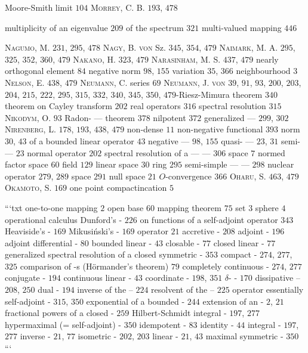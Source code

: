 Moore-Smith limit $104$ \textsc{Morrey}, C. B. $193$, $478$

multiplicity of an eigenvalue $209$ of the spectrum $321$ multi-valued mapping $446$ 

\textsc{Nagumo}, M. $231$, $295$, $478$ \textsc{Nagy}, B. \textsc{von} Sz. $345$, $354$, $479$ \textsc{Naimark}, M. A. $295$, $325$, $352$, $360$, $479$ \textsc{Nakano}, H. $323$, $479$ \textsc{Narasinham}, M. S. $437$, $479$ nearly orthogonal element $84$ negative norm $98$, $155$ variation $35$, $366$ neighbourhood $3$ \textsc{Nelson}, E. $438$, $479$ \textsc{Neumann}, C. series $69$ \textsc{Neumann}, J. \textsc{von} $39$, $91$, $93$, $200$, $203$, $204$, $215$, $222$, $295$, $315$, $332$, $340$, $345$, $350$, $479$-Riesz-Mimura theorem $340$ theorem on Cayley transform $202$ real operators $316$ spectral resolution $315$ \textsc{Nikodym}, O. $93$ Radon- --- theorem $378$ nilpotent $372$ generalized --- $299$, $302$ \textsc{Nirenberg}, L. $178$, $193$, $438$, $479$ non-dense $11$ non-negative functional $393$ norm $30$, $43$ of a bounded linear operator $43$ negative --- $98$, $155$ quasi- --- $23$, $31$ semi- --- $23$ normal operator $202$ spectral resolution of a --- --- $306$ space $7$ normed factor space $60$ field $129$ linear space $30$ ring $295$ semi-simple --- --- $298$ nuclear operator $279$, $289$ space $291$ null space $21$ $O$-convergence $366$ \textsc{Oharu}, S. $463$, $479$ \textsc{Okamoto}, S. $169$ one point compactincation $5$ 

```txt one-to-one mapping $2$ open base $60$ mapping theorem $75$ set $3$ sphere $4$ operational calculus Dunford's - $226$ on functions of a self-adjoint operator $343$ Heaviside's - $169$ Mikusiński's - $169$ operator $21$ accretive - $208$ adjoint - $196$ adjoint differential - $80$ bounded linear - $43$ closable - $77$ closed linear - $77$ generalized spectral resolution of a closed symmetric - $353$ compact - $274$, $277$, $325$ comparison of -s (Hörmander's theorem) $79$ completely continuous - $274$, $277$ conjugate - $194$ continuous linear - $43$ coordinate - $198$, $351$ $\delta$- - $170$ dissipative -- $208$, $250$ dual - $194$ inverse of the -- $224$ resolvent of the -- $225$ operator essentially self-adjoint - $315$, $350$ exponential of a bounded - $244$ extension of an - $2$, $21$ fractional powers of a closed - $259$ Hilbert-Schmidt integral - $197$, $277$ hypermaximal (= self-adjoint) - $350$ idempotent - $83$ identity - $44$ integral - $197$, $277$ inverse - $21$, $77$ isometric - $202$, $203$ linear - $21$, $43$ maximal symmetric - $350$ ```

